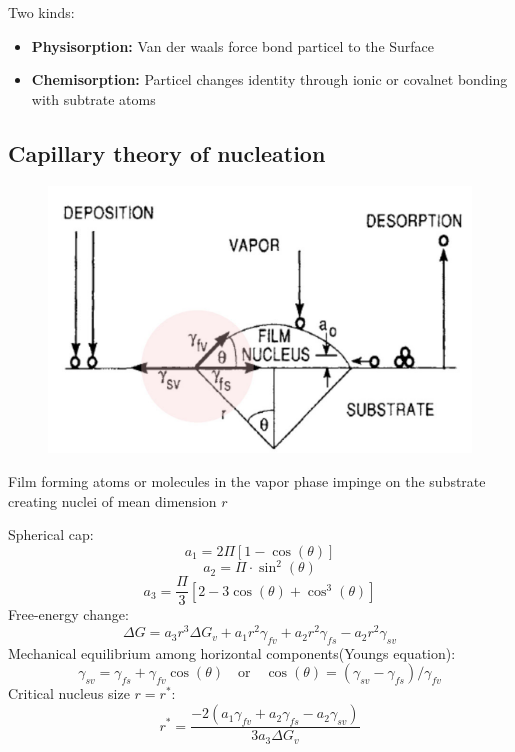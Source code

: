 Two kinds:
\begin{itemize}
    \item \textbf{Physisorption:} Van der waals force bond particel to the Surface
    \item \textbf{Chemisorption:} Particel changes identity through ionic or covalnet bonding with subtrate atoms
\end{itemize}

\subsection{Capillary theory of nucleation}
\begin{figure}[h]
    \centering
    \includegraphics[width=0.7\columnwidth]{images/nucleation.png}
    \label{fig:nucleation}
\end{figure}
Film forming atoms or molecules in the vapor phase impinge on the substrate creating nuclei of mean dimension \(r\)

Spherical cap:
\[
a_1 = 2\Pi\left[1 -  \cos(\theta)\right]
\]
\[
a_2 = \Pi\cdot\sin^2(\theta)
\]
\[
a_3 = \frac{\Pi}{3}\left[2 - 3\cos(\theta) + \cos^3(\theta)\right]
\]
Free-energy change:
\[
\Delta G = a_3 r^3 \Delta G_v + a_1 r^2 \gamma_{fv} + a_2 r^2 \gamma_{fs} - a_2 r^2 \gamma_{sv}
\]
Mechanical equilibrium among horizontal components(Youngs equation):
\[
\gamma_{sv} = \gamma_{fs} + \gamma_{fv} \cos(\theta)\quad\text{or}\quad \cos(\theta) = (\gamma_{sv} -\gamma_{fs})/\gamma_{fv}
\]
Critical nucleus size \(r = r^*\):
\[
r^* = \frac{-2(a_1 \gamma_{fv}+a_2 \gamma_{fs} - a_2 \gamma_{sv})}{3 a_3 \Delta G_v}
\]
